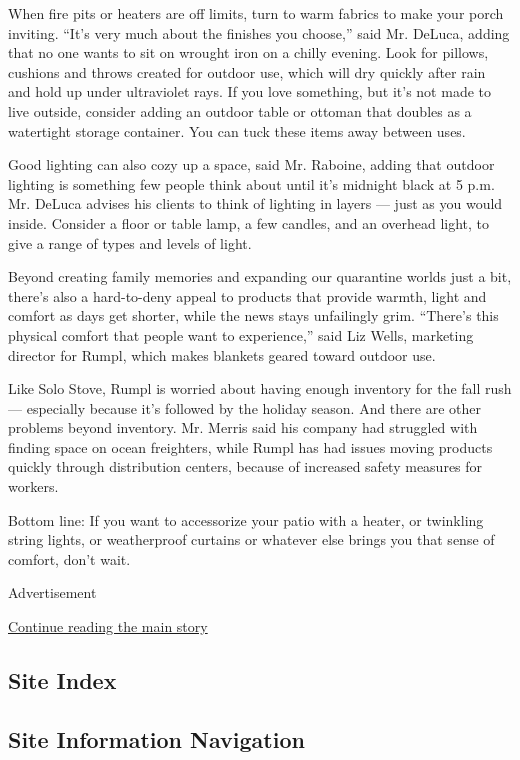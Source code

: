 When fire pits or heaters are off limits, turn to warm fabrics to make
your porch inviting. ``It's very much about the finishes you choose,''
said Mr. DeLuca, adding that no one wants to sit on wrought iron on a
chilly evening. Look for pillows, cushions and throws created for
outdoor use, which will dry quickly after rain and hold up under
ultraviolet rays. If you love something, but it's not made to live
outside, consider adding an outdoor table or ottoman that doubles as a
watertight storage container. You can tuck these items away between
uses.

Good lighting can also cozy up a space, said Mr. Raboine, adding that
outdoor lighting is something few people think about until it's midnight
black at 5 p.m. Mr. DeLuca advises his clients to think of lighting in
layers --- just as you would inside. Consider a floor or table lamp, a
few candles, and an overhead light, to give a range of types and levels
of light.

Beyond creating family memories and expanding our quarantine worlds just
a bit, there's also a hard-to-deny appeal to products that provide
warmth, light and comfort as days get shorter, while the news stays
unfailingly grim. ``There's this physical comfort that people want to
experience,'' said Liz Wells, marketing director for Rumpl, which makes
blankets geared toward outdoor use.

Like Solo Stove, Rumpl is worried about having enough inventory for the
fall rush --- especially because it's followed by the holiday season.
And there are other problems beyond inventory. Mr. Merris said his
company had struggled with finding space on ocean freighters, while
Rumpl has had issues moving products quickly through distribution
centers, because of increased safety measures for workers.

Bottom line: If you want to accessorize your patio with a heater, or
twinkling string lights, or weatherproof curtains or whatever else
brings you that sense of comfort, don't wait.

Advertisement

\protect\hyperlink{after-bottom}{Continue reading the main story}

\hypertarget{site-index}{%
\subsection{Site Index}\label{site-index}}

\hypertarget{site-information-navigation}{%
\subsection{Site Information
Navigation}\label{site-information-navigation}}

